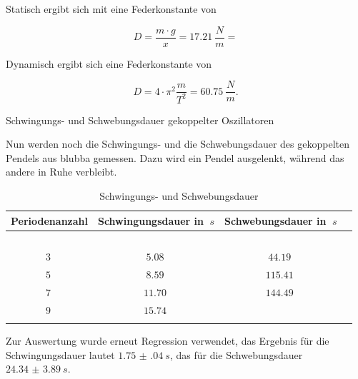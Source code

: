Statisch ergibt sich mit eine Federkonstante von

\begin{equation}
    D = \frac{m \cdot g}{x} =\SI{17,21}{\frac{N}{m}} = 
\end{equation}

Dynamisch ergibt sich eine Federkonstante von

\begin{equation}
    D = 4 \cdot \pi^2 \frac{m}{T^2} = \SI{60,75}{\frac{N}{m}}.
\end{equation}

Schwingungs- und Schwebungsdauer gekoppelter Oszillatoren

Nun werden noch die Schwingungs- und die Schwebungsdauer des gekoppelten Pendels aus blubba gemessen.
Dazu wird ein Pendel ausgelenkt, während das andere in Ruhe verbleibt.

\begin{table}[h!]
    \begin{center}
        \caption{Schwingungs- und Schwebungsdauer}
        \begin{tabular}{cccc}
            \hline
            Periodenanzahl & Schwingungsdauer in $\SI{}{s}$ & Schwebungsdauer in $\SI{}{s}$ \\
            \hline
            $\SI{}{}$ & $\SI{}{}$ & $\SI{}{}$ \\
            $\SI{3}{}$ & $\SI{5,08 }{}$ & $\SI{44,19 }{}$ \\
            $\SI{5}{}$ & $\SI{8,59 }{}$ & $\SI{115,41}{}$ \\
            $\SI{7}{}$ & $\SI{11,70}{}$ & $\SI{144,49}{}$ \\
            $\SI{9}{}$ & $\SI{15,74}{}$ &  \\
            \hline
            \label{tab:Feder-dynamisch-Messwerte}
        \end{tabular}
    \end{center}
\end{table}

Zur Auswertung wurde erneut Regression verwendet, das Ergebnis für die Schwingungsdauer lautet $\SI{1.75(04)}{s}$, das für die Schwebungsdauer $\SI{24.34(389)}{s}$.